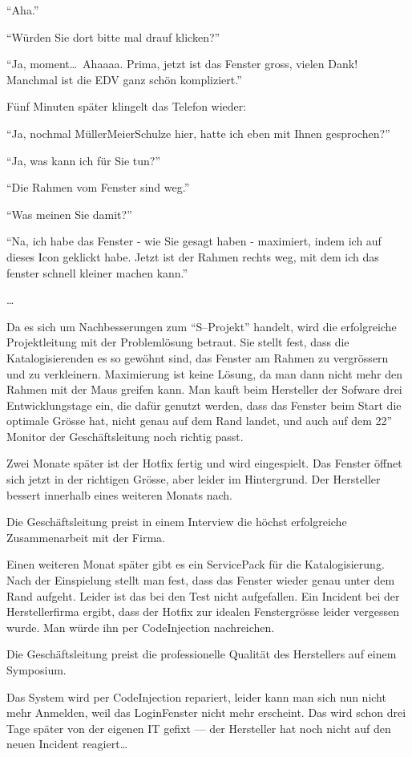 \documentclass[german,headsepline]{scrartcl}
\begin{document}
``Aha.''

``Würden Sie dort bitte mal drauf klicken?''

``Ja, moment\ldots\ Ahaaaa. Prima, jetzt ist das Fenster gross, vielen Dank! Manchmal ist die EDV ganz schön kompliziert.''

Fünf Minuten später klingelt das Telefon wieder:

``Ja, nochmal MüllerMeierSchulze hier, hatte ich eben mit Ihnen gesprochen?''

``Ja, was kann ich für Sie tun?''

``Die Rahmen vom Fenster sind weg.''

``Was meinen Sie damit?''

``Na, ich habe das Fenster - wie Sie gesagt haben - maximiert, indem ich auf dieses Icon geklickt habe. Jetzt ist der Rahmen rechts weg, mit dem ich das fenster schnell kleiner machen kann.''

\ldots

Da es sich um Nachbesserungen zum ``S--Projekt'' handelt, wird die erfolgreiche Projektleitung mit der Problemlösung betraut. Sie stellt fest, dass die Katalogisierenden es so gewöhnt sind, das Fenster am Rahmen zu vergrössern und zu verkleinern. Maximierung ist keine Lösung, da man dann nicht mehr den Rahmen mit der Maus greifen kann. Man kauft beim Hersteller der Sofware drei Entwicklungstage ein, die dafür genutzt werden, dass das Fenster beim Start die optimale Grösse hat, nicht genau auf dem Rand landet, und auch auf dem 22” Monitor der Geschäftsleitung noch richtig passt. 

Zwei Monate später ist der Hotfix fertig und wird eingespielt. Das Fenster öffnet sich jetzt in der richtigen Grösse, aber leider im Hintergrund. Der Hersteller bessert innerhalb eines weiteren Monats nach.

Die Geschäftsleitung preist in einem Interview die höchst erfolgreiche Zusammenarbeit mit der Firma.

Einen weiteren Monat später gibt es ein ServicePack für die Katalogisierung. Nach der Einspielung stellt man fest, dass das Fenster wieder genau unter dem Rand aufgeht. Leider ist das bei den Test nicht aufgefallen. Ein Incident bei der Herstellerfirma ergibt, dass der Hotfix zur idealen Fenstergrösse leider vergessen wurde. Man würde ihn per CodeInjection nachreichen.

Die Geschäftsleitung preist die professionelle Qualität des Herstellers auf einem Symposium.

Das System wird per CodeInjection repariert, leider kann man sich nun nicht mehr Anmelden, weil das LoginFenster nicht mehr erscheint. Das wird schon drei Tage später von der eigenen IT gefixt --- der Hersteller hat noch nicht auf den neuen Incident reagiert\ldots
\end{document}
